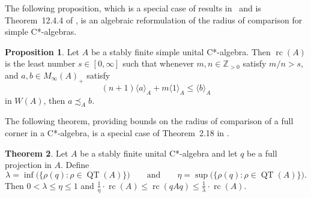 \documentclass[10pt]{amsart}
\numberwithin{equation}{section}
\theoremstyle{definition}
\newtheorem{thm}{Theorem}[section]
\newtheorem{prp}[thm]{Proposition}
\newcommand{\et}{\eta}
\newcommand{\ld}{\lambda}
\newcommand{\N}{{\mathbb{Z}}_{> 0}}
\newcommand{\QT}{{\operatorname{QT}}}
\newcommand{\rc}{{\operatorname{rc}}}
\newcommand{\andeqn}{\qquad {\mbox{and}} \qquad}
\newcommand{\ca}{C*-algebra}
\begin{document}
The following proposition, which is a
special case of results in~\cite{BRTTW12} and is Theorem~12.4.4 of \cite{GKPT18},
 is an algebraic reformulation of the radius of comparison for simple C*-algebras.
%
\begin{prp}\label{rc_alg_def}
Let $A$ be a stably finite simple unital C*-algebra.
Then  $\rc(A)$ is the least number $s \in [0, \infty]$ such that
whenever $m,n \in \N$ satisfy $m/n > s$, and $a,b \in M_{\infty} (A)_+$ satisfy
\[
(n + 1)\langle a \rangle_ A + m\langle 1 \rangle_ A \leq \langle b \rangle_ A
\]
in $W(A)$, then $a \precsim_A b$.
\end{prp}
The following theorem, providing bounds on the radius of comparison of a full corner
in a \ca, is a special case of Theorem~2.18 in \cite{AGP19}. 
\begin{thm}\label{Ourcornertheorem}
Let $A$ be a stably finite unital \ca{}
and let $q$ be a full
projection in $A$.
Define
\[
\lambda
 = \inf \bigl( \bigl\{ \rho (q) \colon
     \rho \in \QT (A) \bigr\} \bigr)
\andeqn
\eta
 = \sup \bigl( \bigl\{ \rho (q) \colon
     \rho \in \QT (A) \bigr\} \bigr).
\]
Then $0 < \ld \leq \et \leq 1$ and
$
\frac{1}{\eta} \cdot \rc (A)
 \leq \rc ( q A q )
 \leq \frac{1}{\lambda} \cdot \rc (A).
$
\end{thm}
\end{document}
